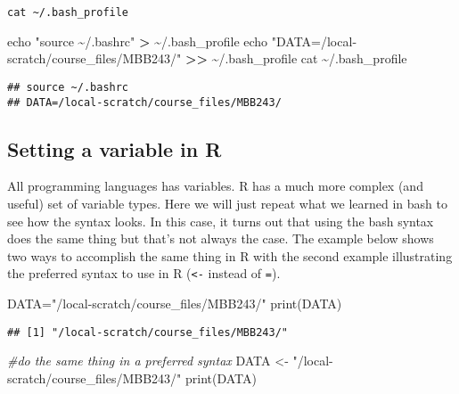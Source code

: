 \documentclass[
]{article}
\newenvironment{Shaded}{\begin{snugshade}}{\end{snugshade}}
\newcommand{\BuiltInTok}[1]{#1}
\newcommand{\CommentTok}[1]{\textcolor[rgb]{0.56,0.35,0.01}{\textit{#1}}}
\newcommand{\FunctionTok}[1]{\textcolor[rgb]{0.00,0.00,0.00}{#1}}
\newcommand{\NormalTok}[1]{#1}
\newcommand{\OperatorTok}[1]{\textcolor[rgb]{0.81,0.36,0.00}{\textbf{#1}}}
\newcommand{\OtherTok}[1]{\textcolor[rgb]{0.56,0.35,0.01}{#1}}
\newcommand{\StringTok}[1]{\textcolor[rgb]{0.31,0.60,0.02}{#1}}
\begin{document}
\texttt{cat\ \textasciitilde{}/.bash\_profile}

\begin{Shaded}
\begin{Highlighting}[]
\BuiltInTok{echo} \StringTok{"source \textasciitilde{}/.bashrc"} \OperatorTok{\textgreater{}}\NormalTok{ \textasciitilde{}/.bash\_profile}
\BuiltInTok{echo} \StringTok{"DATA=/local{-}scratch/course\_files/MBB243/"} \OperatorTok{\textgreater{}\textgreater{}}\NormalTok{ \textasciitilde{}/.bash\_profile}
\FunctionTok{cat}\NormalTok{ \textasciitilde{}/.bash\_profile}
\end{Highlighting}
\end{Shaded}

\begin{verbatim}
## source ~/.bashrc
## DATA=/local-scratch/course_files/MBB243/
\end{verbatim}

\hypertarget{setting-a-variable-in-r}{%
\subsection{Setting a variable in R}\label{setting-a-variable-in-r}}

All programming languages has variables. R has a much more complex (and
useful) set of variable types. Here we will just repeat what we learned
in bash to see how the syntax looks. In this case, it turns out that
using the bash syntax does the same thing but that's not always the
case. The example below shows two ways to accomplish the same thing in R
with the second example illustrating the preferred syntax to use in R
(\texttt{\textless{}-} instead of \texttt{=}).

\begin{Shaded}
\begin{Highlighting}[]
\NormalTok{DATA}\OtherTok{=}\StringTok{"/local{-}scratch/course\_files/MBB243/"}
\FunctionTok{print}\NormalTok{(DATA)}
\end{Highlighting}
\end{Shaded}

\begin{verbatim}
## [1] "/local-scratch/course_files/MBB243/"
\end{verbatim}

\begin{Shaded}
\begin{Highlighting}[]
\CommentTok{\#do the same thing in a preferred syntax}
\NormalTok{DATA }\OtherTok{\textless{}{-}} \StringTok{"/local{-}scratch/course\_files/MBB243/"}
\FunctionTok{print}\NormalTok{(DATA)}
\end{Highlighting}
\end{Shaded}
\end{document}
